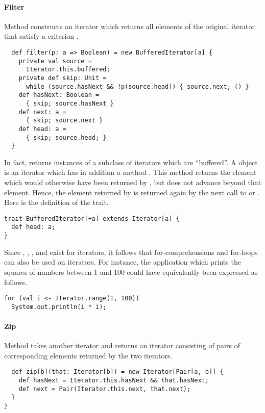 {\paragraph{Filter} Method  constructs an iterator which
returns all elements of the original iterator that satisfy a criterion
.
\begin{lstlisting}
  def filter(p: a => Boolean) = new BufferedIterator[a] {
    private val source = 
      Iterator.this.buffered;
    private def skip: Unit = 
      while (source.hasNext && !p(source.head)) { source.next; () }
    def hasNext: Boolean = 
      { skip; source.hasNext }
    def next: a = 
      { skip; source.next }
    def head: a = 
      { skip; source.head; }
  }
\end{lstlisting}
In fact,  returns instances of a subclass of iterators
which are ``buffered''.  A  object is an
iterator which has in addition a method . This method
returns the element which would otherwise have been returned by
, but does not advance beyond that element. Hence, the
element returned by  is returned again by the next call to
 or . Here is the definition of the
 trait.
\begin{lstlisting}
trait BufferedIterator[+a] extends Iterator[a] {
  def head: a;
}
\end{lstlisting}
Since , , , and 
exist for iterators, it follows that for-comprehensions and for-loops
can also be used on iterators. For instance, the application which prints the squares of numbers between 1 and 100 could have equivalently been expressed as follows.
\begin{lstlisting}
for (val i <- Iterator.range(1, 100))
  System.out.println(i * i);
\end{lstlisting}

\paragraph{Zip} Method  takes another iterator and
returns an iterator consisting of pairs of corresponding elements
returned by the two iterators.
\begin{lstlisting}
  def zip[b](that: Iterator[b]) = new Iterator[Pair[a, b]] {
    def hasNext = Iterator.this.hasNext && that.hasNext;
    def next = Pair(Iterator.this.next, that.next);
  }
}
\end{lstlisting}

}
